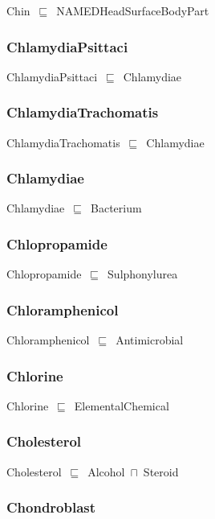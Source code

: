 \documentclass{article}
\begin{document}
Chin~\ensuremath{\sqsubseteq}~NAMEDHeadSurfaceBodyPart~

\subsubsection*{ChlamydiaPsittaci}

ChlamydiaPsittaci~\ensuremath{\sqsubseteq}~Chlamydiae~

\subsubsection*{ChlamydiaTrachomatis}

ChlamydiaTrachomatis~\ensuremath{\sqsubseteq}~Chlamydiae~

\subsubsection*{Chlamydiae}

Chlamydiae~\ensuremath{\sqsubseteq}~Bacterium~

\subsubsection*{Chlopropamide}

Chlopropamide~\ensuremath{\sqsubseteq}~Sulphonylurea~

\subsubsection*{Chloramphenicol}

Chloramphenicol~\ensuremath{\sqsubseteq}~Antimicrobial~

\subsubsection*{Chlorine}

Chlorine~\ensuremath{\sqsubseteq}~ElementalChemical~

\subsubsection*{Cholesterol}

Cholesterol~\ensuremath{\sqsubseteq}~Alcohol~\ensuremath{\sqcap}~Steroid~

\subsubsection*{Chondroblast}
\end{document}
